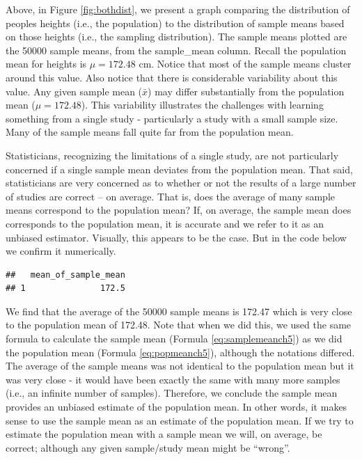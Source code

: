 \documentclass[
]{krantz}
\makeatletter
\newenvironment{Shaded}{\begin{snugshade}}{\end{snugshade}}
\newcommand{\DataTypeTok}[1]{\textcolor[rgb]{0.27,0.27,0.27}{#1}}
\newcommand{\KeywordTok}[1]{\textcolor[rgb]{0.27,0.27,0.27}{\textbf{#1}}}
\newcommand{\NormalTok}[1]{#1}
\newcommand{\OperatorTok}[1]{\textcolor[rgb]{0.43,0.43,0.43}{\textbf{#1}}}
\newcommand{\StringTok}[1]{\textcolor[rgb]{0.5,0.5,0.5}{#1}}
\newenvironment{kframe}{%
\medskip{}
\setlength{\fboxsep}{.8em}
 \def\at@end@of@kframe{}%
 \ifinner\ifhmode%
  \def\at@end@of@kframe{\end{minipage}}%
  \begin{minipage}{\columnwidth}%
 \fi\fi%
 \def\FrameCommand##1{\hskip\@totalleftmargin \hskip-\fboxsep
 \colorbox{shadecolor}{##1}\hskip-\fboxsep
     \hskip-\linewidth \hskip-\@totalleftmargin \hskip\columnwidth}%
 \MakeFramed {\advance\hsize-\width
   \@totalleftmargin\z@ \linewidth\hsize
   \@setminipage}}%
 {\par\unskip\endMakeFramed%
 \at@end@of@kframe}
\renewenvironment{Shaded}{\begin{kframe}}{\end{kframe}}
\makeatother
\begin{document}
Above, in Figure \ref{fig:bothdist}, we present a graph comparing the distribution of peoples heights (i.e., the population) to the distribution of sample means based on those heights (i.e., the sampling distribution). The sample means plotted are the 50000 sample means, from the sample\_mean column. Recall the population mean for heights is \(\mu = 172.48\) cm. Notice that most of the sample means cluster around this value. Also notice that there is considerable variability about this value. Any given sample mean (\(\bar{x}\)) may differ substantially from the population mean (\(\mu = 172.48\)). This variability illustrates the challenges with learning something from a single study - particularly a study with a small sample size. Many of the sample means fall quite far from the population mean.

Statisticians, recognizing the limitations of a single study, are not particularly concerned if a single sample mean deviates from the population mean. That said, statisticians are very concerned as to whether or not the results of a large number of studies are correct -- on average. That is, does the average of many sample means correspond to the population mean? If, on average, the sample mean does corresponds to the population mean, it is accurate and we refer to it as an unbiased estimator. Visually, this appears to be the case. But in the code below we confirm it numerically.

\begin{Shaded}
\end{Shaded}

\begin{verbatim}
##   mean_of_sample_mean
## 1               172.5
\end{verbatim}

We find that the average of the 50000 sample means is 172.47 which is very close to the population mean of 172.48. Note that when we did this, we used the same formula to calculate the sample mean (Formula \eqref{eq:samplemeanch5}) as we did the population mean (Formula \eqref{eq:popmeanch5}), although the notations differed. The average of the sample means was not identical to the population mean but it was very close - it would have been exactly the same with many more samples (i.e., an infinite number of samples). Therefore, we conclude the sample mean provides an unbiased estimate of the population mean. In other words, it makes sense to use the sample mean as an estimate of the population mean. If we try to estimate the population mean with a sample mean we will, on average, be correct; although any given sample/study mean might be ``wrong''.
\end{document}
